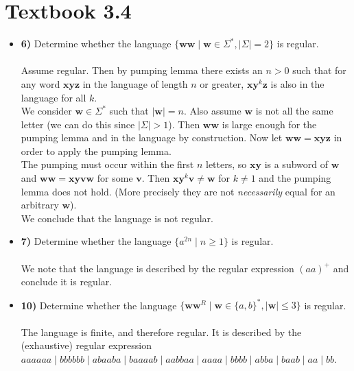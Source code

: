 \documentclass[defaultpackages]{simplereport}
\begin{document}
\section*{Textbook 3.4}
\begin{itemize}[label=]
  \item \textbf{6)} Determine whether the language $\{\mathbf{ww} \mid
    \mathbf{w} \in \Sigma^*, \lvert \Sigma \rvert = 2\}$ is regular.\\
    \\
    Assume regular. Then by pumping lemma there exists an $n > 0$ such that for
    any word $\mathbf{xyz}$ in the language of length $n$ or greater,
    $\mathbf{x}\mathbf{y}^k\mathbf{z}$ is also in the language for all $k$.\\
    We consider $\mathbf{w} \in \Sigma^*$ such that $\lvert \mathbf{w} \rvert =
    n$. Also assume $\mathbf{w}$ is not all the same letter (we can do this
    since $\lvert \Sigma \rvert > 1$). Then $\mathbf{ww}$ is large enough for the pumping lemma and in the
    language by construction. Now let $\mathbf{ww} = \mathbf{xyz}$ in order to
    apply the pumping lemma.\\
    The pumping must occur within the first $n$ letters, so $\mathbf{xy}$ is a
    subword of $\mathbf{w}$ and $\mathbf{ww} = \mathbf{xyvw}$ for some $\mathbf{v}$.
    Then $\mathbf{xy}^k\mathbf{v} \neq \mathbf{w}$ for $k \neq 1$
    and the pumping lemma does not hold. (More precisely they are not
    \textit{necessarily} equal for an arbitrary $\mathbf{w}$).\\
    We conclude that the language is not regular.
  \item \textbf{7)} Determine whether the language $\{a^{2n} \mid n \geq 1\}$ is
    regular.\\\\
    We note that the language is described by the regular expression $(aa)^+$
    and conclude it is regular.
  \item \textbf{10)} Determine whether the language $\{\mathbf{ww}^R \mid
    \mathbf{w} \in \{a, b\}^*, \lvert \mathbf{w} \rvert \leq 3\}$ is
    regular.\\\\
    The language is finite, and therefore regular. It is described by the
    (exhaustive) regular expression ${aaaaaa} \mid {bbbbbb} \mid
    {abaaba} \mid {baaaab} \mid {aabbaa} \mid {aaaa}
    \mid {bbbb} \mid {abba} \mid {baab} \mid {aa} \mid {bb}$.
\end{itemize}
\end{document}

